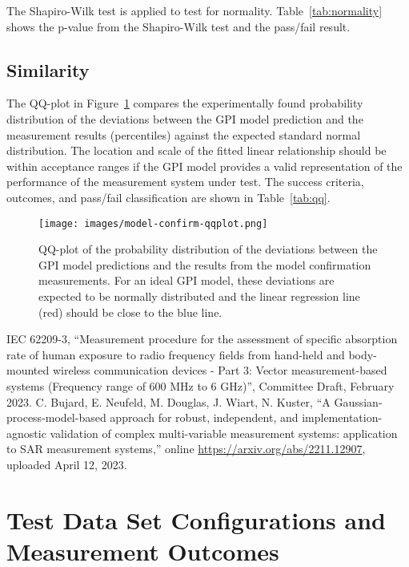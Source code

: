 \documentclass{article}
\begin{document}
The Shapiro-Wilk test is applied to test for normality. Table~\ref{tab:normality} shows the p-value from the Shapiro-Wilk test and the pass/fail result.



\FloatBarrier
\subsection{Similarity}

The QQ-plot in Figure~\ref{fig:confirm-qqplot} compares the experimentally found probability distribution of the deviations between the GPI model prediction and the measurement results (percentiles) against the expected standard normal distribution. The location and scale of the fitted linear relationship should be within acceptance ranges if the GPI model provides a valid representation of the performance of the measurement system under test. The success criteria, outcomes, and pass/fail classification are shown in Table~\ref{tab:qq}.



\begin{figure} \centering
\texttt{[image: images/model-confirm-qqplot.png]}
\caption{QQ-plot of the probability distribution of the deviations between the GPI model predictions and the results from the model confirmation measurements. For an ideal GPI model, these deviations are expected to be normally distributed and the linear regression line (red) should be close to the blue line.} \label{fig:confirm-qqplot}
\end{figure}

\FloatBarrier
\begin{thebibliography}{9}
IEC 62209-3, ``Measurement procedure for the assessment of specific absorption rate of human exposure to radio frequency fields from hand-held and body-mounted wireless communication devices - Part 3: Vector measurement-based systems (Frequency range of 600 MHz to 6 GHz)'', Committee Draft, February 2023.
C. Bujard, E. Neufeld, M. Douglas, J. Wiart, N. Kuster, ``A Gaussian-process-model-based approach for robust, independent, and implementation-agnostic validation of complex multi-variable measurement systems: application to SAR measurement systems,'' online \url{https://arxiv.org/abs/2211.12907}, uploaded April 12, 2023.
\end{thebibliography}

\FloatBarrier
\newpage
\appendix
\section{Test Data Set Configurations and Measurement Outcomes} \label{sec:test-data}


\end{document}
